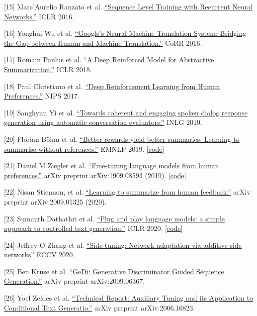{[}15{]} Marc'Aurelio Ranzato et al. \href{https://arxiv.org/abs/1511.06732}{``Sequence Level Training with Recurrent Neural Networks.''} ICLR 2016.

{[}16{]} Yonghui Wu et al. \href{https://arxiv.org/abs/1609.08144}{``Google's Neural Machine Translation System: Bridging the Gap between Human and Machine Translation.''} CoRR 2016.

{[}17{]} Romain Paulus et al. \href{https://arxiv.org/abs/1705.04304}{``A Deep Reinforced Model for Abstractive Summarization.''} ICLR 2018.

{[}18{]} Paul Christiano et al. \href{https://arxiv.org/abs/1706.03741}{``Deep Reinforcement Learning from Human Preferences.''} NIPS 2017.

{[}19{]} Sanghyun Yi et al. \href{https://arxiv.org/abs/1904.13015}{``Towards coherent and engaging spoken dialog response generation using automatic conversation evaluators.''} INLG 2019.

{[}20{]} Florian Böhm et al. \href{https://arxiv.org/abs/1909.01214}{``Better rewards yield better summaries: Learning to summarise without references.''} EMNLP 2019. {[}\href{https://github.com/yg211/summary-reward-no-reference}{code}{]}

{[}21{]} Daniel M Ziegler et al. \href{https://arxiv.org/abs/1909.08593}{``Fine-tuning language models from human preferences.''} arXiv preprint arXiv:1909.08593 (2019). {[}\href{https://github.com/openai/lm-human-preferences}{code}{]}

{[}22{]} Nisan Stiennon, et al. \href{https://arxiv.org/abs/2009.01325}{``Learning to summarize from human feedback.''} arXiv preprint arXiv:2009.01325 (2020).

{[}23{]} Sumanth Dathathri et al. \href{https://arxiv.org/abs/1912.02164}{``Plug and play language models: a simple approach to controlled text generation.''} ICLR 2020. {[}\href{https://github.com/uber-research/PPLM}{code}{]}

{[}24{]} Jeffrey O Zhang et al. \href{https://arxiv.org/abs/1912.13503}{``Side-tuning: Network adaptation via additive side networks''} ECCV 2020.

{[}25{]} Ben Kruse et al. \href{https://arxiv.org/abs/2009.06367}{``GeDi: Generative Discriminator Guided Sequence Generation.''} arXiv preprint arXiv:2009.06367.

{[}26{]} Yoel Zeldes et al. \href{https://arxiv.org/abs/2006.16823}{``Technical Report: Auxiliary Tuning and its Application to Conditional Text Generatio.''} arXiv preprint arXiv:2006.16823.

